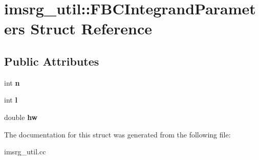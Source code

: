 \hypertarget{structimsrg__util_1_1FBCIntegrandParameters}{}\section{imsrg\+\_\+util\+:\+:F\+B\+C\+Integrand\+Parameters Struct Reference}
\label{structimsrg__util_1_1FBCIntegrandParameters}
\subsection*{Public Attributes}
\begin{DoxyCompactItemize}
\item 
\mbox{\label{structimsrg__util_1_1FBCIntegrandParameters_a5bd63770686a719fb3e3911f10e85996}} 
int {\bfseries n}
\item 
\mbox{\label{structimsrg__util_1_1FBCIntegrandParameters_a7fa7bf6436708e643e8c3bb1ba6eae6f}} 
int {\bfseries l}
\item 
\mbox{\label{structimsrg__util_1_1FBCIntegrandParameters_a6c6bc708683789b7bbfaeb137ac9e5ee}} 
double {\bfseries hw}
\end{DoxyCompactItemize}


The documentation for this struct was generated from the following file\+:\begin{DoxyCompactItemize}
\item 
imsrg\+\_\+util.\+cc\end{DoxyCompactItemize}
